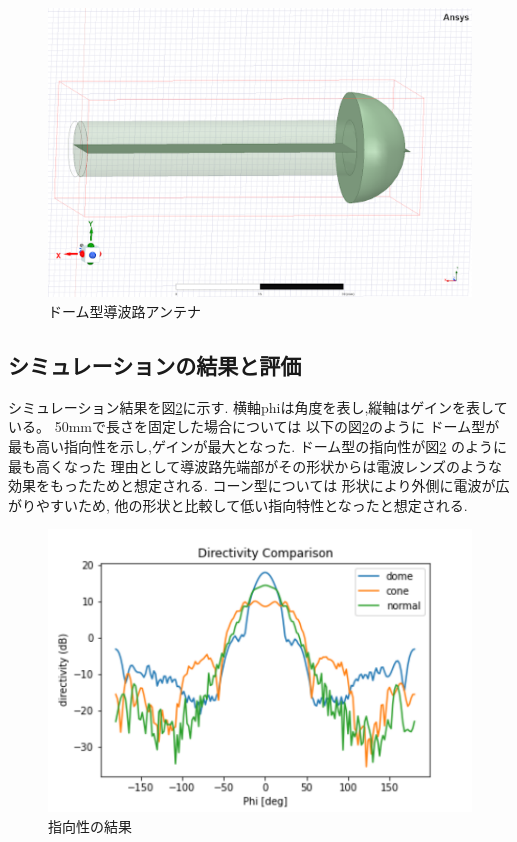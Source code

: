 \documentclass[technicalreport]{ieicej}
\begin{document}
\begin{figure}[tb]
  \begin{center}
    \includegraphics[bb=0 0 384 262, width=0.7\linewidth]{img/dome.pdf}
    \caption{ドーム型導波路アンテナ}
    \label{fig:dome}
  \end{center}
\end{figure}

\subsection{シミュレーションの結果と評価}

シミュレーション結果を図\ref{fig:directivity_results}に示す.
横軸phiは角度を表し,縦軸はゲインを表している。
50mmで長さを固定した場合については
以下の図\ref{fig:directivity_results}のように
ドーム型が最も高い指向性を示し,ゲインが最大となった.
ドーム型の指向性が図\ref{fig:directivity_results} のように最も高くなった
理由として導波路先端部がその形状からは電波レンズのような効果をもったためと想定される.
コーン型については
形状により外側に電波が広がりやすいため,
他の形状と比較して低い指向特性となったと想定される.

\begin{figure}[tb]
  \begin{center}
    \includegraphics[bb=0.000000 0.000000 432.098422 288.065615, width=1.0\linewidth]{img/directivity_comparison.pdf}
    \caption{指向性の結果}
    \label{fig:directivity_results}
  \end{center}
\end{figure}
\end{document}
